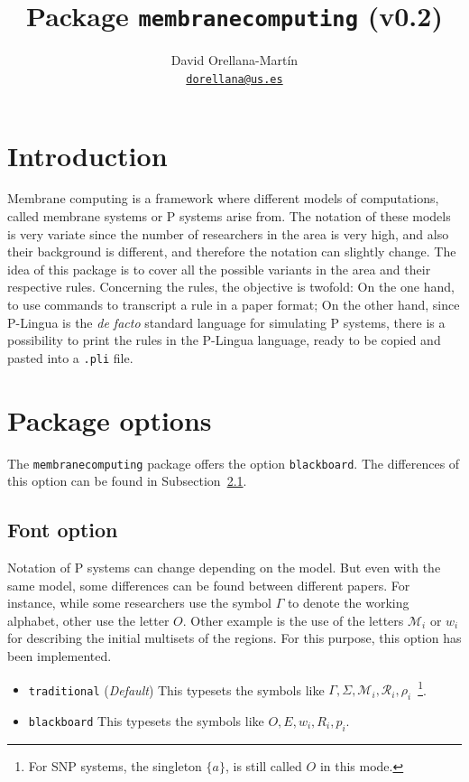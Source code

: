 \documentclass{article}
\title{Package \texttt{membranecomputing} (v0.2)}
\author{David Orellana-Martín \\ \texttt{\href{mailto:dorellana@us.es}{dorellana@us.es}}}
\begin{document}
\maketitle

\tableofcontents

\section{Introduction}
\label{sec:introduction}

Membrane computing is a framework where different models of
computations, called membrane systems or P systems arise from. The
notation of these models is very variate since the number of
researchers in the area is very high, and also their background is
different, and therefore the notation can slightly change. The idea of
this package is to cover all the possible variants in the area and
their respective rules. Concerning the rules, the objective is
twofold: On the one hand, to use commands to transcript a rule in a
paper format; On the other hand, since P-Lingua is the \textit{de
  facto} standard language for simulating P systems, there is a
possibility to print the rules in the P-Lingua language, ready to be
copied and pasted into a \texttt{.pli} file.

\section{Package options}
\label{sec:package-options}

The \texttt{membranecomputing} package offers the option
\texttt{blackboard}. The differences of this option can be found in
Subsection~\ref{sec:font-option}.

\subsection{Font option}
\label{sec:font-option}

Notation of P systems can change depending on the model. But even with
the same model, some differences can be found between different
papers. For instance, while some researchers use the symbol $\Gamma$
to denote the working alphabet, other use the letter $O$. Other
example is the use of the letters $\mathcal{M}_{i}$ or $w_{i}$ for
describing the initial multisets of the regions. For this purpose,
this option has been implemented.

\begin{itemize}
\item \texttt{traditional} (\textit{Default}) This typesets the
  symbols like
  $\Gamma, \Sigma, \mathcal{M}_{i}, \mathcal{R}_{i},
  \rho_{i}$~\footnote{For SNP systems, the singleton $\{a\}$, is still
    called $O$ in this mode.}.
\item \texttt{blackboard} This typesets the symbols like
  $O, E, w_{i}, R_{i}, p_{i}$.
\end{itemize}
\end{document}
